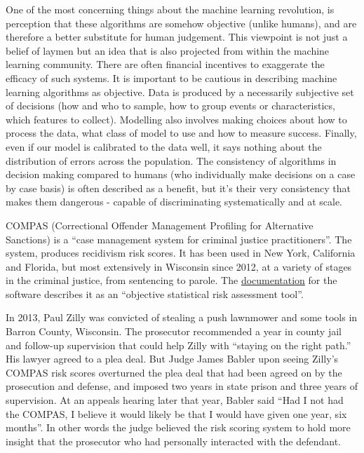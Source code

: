 One of the most concerning things about the machine learning revolution, is perception that these algorithms are somehow objective (unlike humans), and are therefore a better substitute for human judgement. This viewpoint is  not just a belief of laymen but an idea that is also projected from within the machine learning community. There are often financial incentives to exaggerate the efficacy of such systems. It is important to be cautious in describing machine learning algorithms as objective. Data is produced by a necessarily subjective set of decisions (how and who to sample, how to group events or characteristics, which features to collect). Modelling also involves making choices about how to process the data, what class of model to use and how to measure success. Finally, even if our model is calibrated to the data well, it says nothing about the distribution of errors across the population. The consistency of algorithms in decision making compared to humans (who individually make decisions on a case by case basis) is often described as a benefit, but it's their very consistency that makes them dangerous - capable of discriminating systematically and at scale.

COMPAS (Correctional Offender Management Profiling for Alternative Sanctions) is a ``case management system for criminal justice practitioners''.  The system, produces recidivism risk scores. It has been used in New York, California and Florida, but most extensively in Wisconsin since 2012, at a variety of stages in the criminal justice, from sentencing to parole. The \href{https://assets.documentcloud.org/documents/2840784/Practitioner-s-Guide-to-COMPAS-Core.pdf}{documentation} for the software describes it as an ``objective statistical risk assessment tool''.

In 2013, Paul Zilly was convicted of stealing a push lawnmower and some tools in Barron County, Wisconsin. The prosecutor recommended a year in county jail and follow-up supervision that could help Zilly with ``staying on the right path.'' His lawyer agreed to a plea deal. But Judge James Babler upon seeing Zilly's COMPAS risk scores overturned the plea deal that had been agreed on by the prosecution and defense, and imposed two years in state prison and three years of supervision. At an appeals hearing later that year, Babler said ``Had I not had the COMPAS, I believe it would likely be that I would have given one year, six months''\cite{ProPub1}. In other words the judge believed the risk scoring system to hold more insight that the prosecutor who had personally interacted with the defendant.

